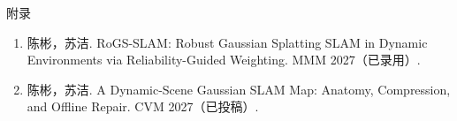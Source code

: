 %
%

\clearpage
{}
{}

\begin{center}
{\heiti{} 附\quad 录}
\end{center}
\vspace{1\baselineskip}

\vspace{0.5\baselineskip}

\begingroup
{}
\setlength{\parindent}{0em}
\begin{enumerate}
  \item 陈彬，苏洁. RoGS-SLAM: Robust Gaussian Splatting SLAM in Dynamic Environments
        via Reliability-Guided Weighting. MMM 2027（已录用）.
  \item 陈彬，苏洁. A Dynamic-Scene Gaussian SLAM Map: Anatomy, Compression, and
        Offline Repair. CVM 2027（已投稿）.
\end{enumerate}
\endgroup

\vspace{\baselineskip}
\vspace{0.5\baselineskip}

\begingroup
{}\setlength{\parindent}{0em}
\endgroup

\vspace{\baselineskip}
\vspace{0.5\baselineskip}

\begingroup
{}\setlength{\parindent}{0em}
\endgroup
